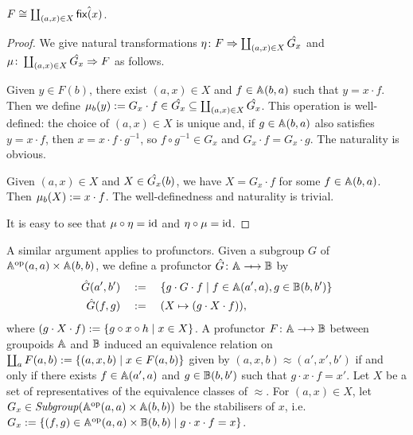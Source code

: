 \begin{proposition}
    \( F \cong \coprod_{(a,x) \in X} \hat{\mathsf{fix}(x)} \).
\end{proposition}
\begin{proof}
    We give natural transformations \( \eta \colon F \Rightarrow \coprod_{(a,x) \in X} \hat{G_x} \) and \( \mu \colon \coprod_{(a,x) \in X} \hat{G_x} \Rightarrow F \) as follows.

    Given \( y \in F(b) \), there exist \( (a,x) \in X \) and \( f \in \mathbb{A}(b,a) \) such that \( y = x \cdot f \).
    Then we define \( \mu_b(y) := G_x \cdot f \in \hat{G_x} \subseteq \coprod_{(a,x) \in X} \hat{G_x} \).
    This operation is well-defined: the choice of \( (a,x) \in X \) is unique and, if \( g \in \mathbb{A}(b,a) \) also satisfies \( y = x \cdot f \), then \( x = x \cdot f \cdot g^{-1} \), so \( f \circ g^{-1} \in G_x \) and \( G_x \cdot f = G_x \cdot g \).
    The naturality is obvious.

    Given \( (a,x) \in X \) and \( X \in \hat{G_x}(b) \), we have \( X = G_x \cdot f \) for some \( f \in \mathbb{A}(b,a) \).
    Then \( \mu_b(X) := x \cdot f \).
    The well-definedness and naturality is trivial.

    It is easy to see that \( \mu \circ \eta = \mathrm{id} \) and \( \eta \circ \mu = \mathrm{id} \).
\end{proof}

A similar argument applies to profunctors.
Given a subgroup \( G \) of \( \mathbb{A}^{\mathrm{op}}(a,a) \times \mathbb{A}(b,b) \), we define a profunctor \( \InducedProf{G} \colon \Grp \profarrow \Grpb \) by 
\begin{align*}
    \hat{G}(a', b')
    &\quad:=\quad
    \{ g \cdot G \cdot f \mid f \in \mathbb{A}(a', a), g \in \mathbb{B}(b, b') \}
    \\
    \hat{G}(f, g)
    &\quad:=\quad
    (X \mapsto (g \cdot X \cdot f)),
\end{align*}
where \( (g \cdot X \cdot f) := \{ g \circ x \circ h \mid x \in X \} \).
A profunctor \( F \colon \Grp \profarrow \Grpb \) between groupoids \( \mathbb{A} \) and \( \mathbb{B} \) induced an equivalence relation on \( \coprod_a F(a,b) := \{ (a, x, b) \mid x \in F(a, b) \} \) given by
\( (a, x, b) \approx (a', x', b') \) if and only if there exists \( f \in \mathbb{A}(a', a) \) and \( g \in \mathbb{B}(b, b') \) such that \( g \cdot x \cdot f = x' \).
Let \( X \) be a set of representatives of the equivalence classes of \( \approx \).
For \( (a, x) \in X \), let \( G_x \in \mathit{Subgroup}(\mathbb{A}^{\mathrm{op}}(a,a) \times \mathbb{A}(b,b)) \) be the stabilisers of \( x \), i.e.~\( G_x := \{ (f,g) \in \mathbb{A}^{\mathrm{op}}(a,a) \times \mathbb{B}(b,b) \mid g \cdot x \cdot f = x \} \).

